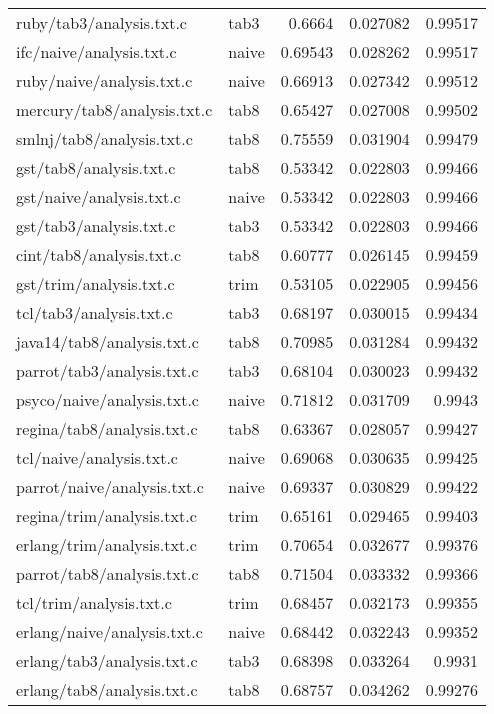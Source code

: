 \begin{longtable}{l l r r r}
{ruby/tab3/analysis.txt.c} & tab3 & 0.6664 & 0.027082 & 0.99517 \\
{ifc/naive/analysis.txt.c} & naive & 0.69543 & 0.028262 & 0.99517 \\
{ruby/naive/analysis.txt.c} & naive & 0.66913 & 0.027342 & 0.99512 \\
{mercury/tab8/analysis.txt.c} & tab8 & 0.65427 & 0.027008 & 0.99502 \\
{smlnj/tab8/analysis.txt.c} & tab8 & 0.75559 & 0.031904 & 0.99479 \\
{gst/tab8/analysis.txt.c} & tab8 & 0.53342 & 0.022803 & 0.99466 \\
{gst/naive/analysis.txt.c} & naive & 0.53342 & 0.022803 & 0.99466 \\
{gst/tab3/analysis.txt.c} & tab3 & 0.53342 & 0.022803 & 0.99466 \\
{cint/tab8/analysis.txt.c} & tab8 & 0.60777 & 0.026145 & 0.99459 \\
{gst/trim/analysis.txt.c} & trim & 0.53105 & 0.022905 & 0.99456 \\
{tcl/tab3/analysis.txt.c} & tab3 & 0.68197 & 0.030015 & 0.99434 \\
{java14/tab8/analysis.txt.c} & tab8 & 0.70985 & 0.031284 & 0.99432 \\
{parrot/tab3/analysis.txt.c} & tab3 & 0.68104 & 0.030023 & 0.99432 \\
{psyco/naive/analysis.txt.c} & naive & 0.71812 & 0.031709 & 0.9943 \\
{regina/tab8/analysis.txt.c} & tab8 & 0.63367 & 0.028057 & 0.99427 \\
{tcl/naive/analysis.txt.c} & naive & 0.69068 & 0.030635 & 0.99425 \\
{parrot/naive/analysis.txt.c} & naive & 0.69337 & 0.030829 & 0.99422 \\
{regina/trim/analysis.txt.c} & trim & 0.65161 & 0.029465 & 0.99403 \\
{erlang/trim/analysis.txt.c} & trim & 0.70654 & 0.032677 & 0.99376 \\
{parrot/tab8/analysis.txt.c} & tab8 & 0.71504 & 0.033332 & 0.99366 \\
{tcl/trim/analysis.txt.c} & trim & 0.68457 & 0.032173 & 0.99355 \\
{erlang/naive/analysis.txt.c} & naive & 0.68442 & 0.032243 & 0.99352 \\
{erlang/tab3/analysis.txt.c} & tab3 & 0.68398 & 0.033264 & 0.9931 \\
{erlang/tab8/analysis.txt.c} & tab8 & 0.68757 & 0.034262 & 0.99276 \\

\end{longtable}
